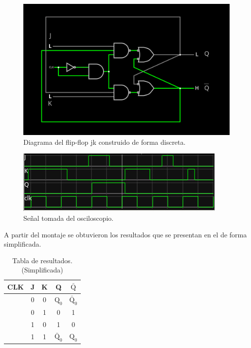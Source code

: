 \documentclass[journal, table]{IEEEtran}
\begin{document}
\begin{figure}[h!]
	\centering
	\includegraphics[width=0.8\linewidth]{./Discrete-FF/ff-jk-circuit.png}
	\caption{Diagrama del flip-flop jk construido de forma discreta.}
	\label{fig:discrete-jk}
\end{figure}

\begin{figure}[h!]
	\centering
	\includegraphics[width=0.8\linewidth]{./Discrete-FF/oscilloscope.jpeg}
	\caption{Señal tomada del osciloscopio.}
	\label{fig:jk-signal}
\end{figure}

A partir del montaje se obtuvieron los resultados que se presentan en el
 de forma simplificada.

\begin{table}[h!]
	\centering
	\begin{tabular}{c|c|c||c|c}
		\toprule
		CLK & J & K & Q & $\bar{\text{Q}}$ \\
		\midrule
		\RaisingEdge & 0 & 0 & $\text{Q}_{0}$ & $\bar{\text{Q}}_{0}$ \\
		\RaisingEdge & 0 & 1 & 0 & 1 \\
		\RaisingEdge & 1 & 0 & 1 & 0 \\
		\RaisingEdge & 1 & 1 & $\bar{\text{Q}}_{0}$ & $\text{Q}_{0}$ \\
		\bottomrule
	\end{tabular}
	\caption{Tabla de resultados. (Simplificada)}
	\label{tab:discrete-jk}
\end{table}
\end{document}
